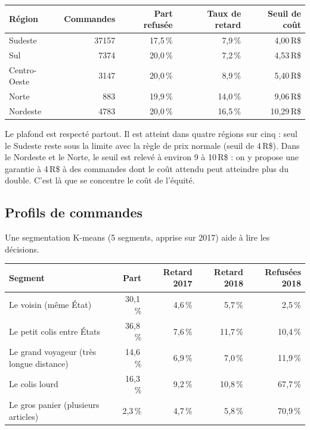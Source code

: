 \documentclass[11pt,a4paper]{article}
\newcommand{\RS}{\,R\$}
\begin{document}
\begin{center}
\begin{tabular}{@{}lrrrr@{}}
\toprule
Région & Commandes & Part refusée & Taux de retard & Seuil de coût \\
\midrule
Sudeste & \num{37157} & 17,5\,\% & 7,9\,\% & 4,00\RS{} \\
Sul & \num{7374} & 20,0\,\% & 7,2\,\% & 4,53\RS{} \\
Centro-Oeste & \num{3147} & 20,0\,\% & 8,9\,\% & 5,40\RS{} \\
Norte & 883 & 19,9\,\% & 14,0\,\% & 9,06\RS{} \\
Nordeste & \num{4783} & 20,0\,\% & 16,5\,\% & 10,29\RS{} \\
\bottomrule
\end{tabular}
\end{center}

Le plafond est respecté partout. Il est atteint dans quatre régions sur cinq : seul le Sudeste
reste sous la limite avec la règle de prix normale (seuil de 4\RS). Dans le Nordeste et le
Norte, le seuil est relevé à environ 9 à 10\RS{} : on y propose une garantie à 4\RS{} à des
commandes dont le coût attendu peut atteindre plus du double. C'est là que se concentre le
coût de l'équité.

\subsection{Profils de commandes}

Une segmentation K-means (5 segments, apprise sur 2017) aide à lire les décisions.

\begin{center}
\begin{tabular}{@{}lrrrr@{}}
\toprule
Segment & Part & Retard 2017 & Retard 2018 & Refusées 2018 \\
\midrule
Le voisin (même État) & 30,1\,\% & 4,6\,\% & 5,7\,\% & 2,5\,\% \\
Le petit colis entre États & 36,8\,\% & 7,6\,\% & 11,7\,\% & 10,4\,\% \\
Le grand voyageur (très longue distance) & 14,6\,\% & 6,9\,\% & 7,0\,\% & 11,9\,\% \\
Le colis lourd & 16,3\,\% & 9,2\,\% & 10,8\,\% & 67,7\,\% \\
Le gros panier (plusieurs articles) & 2,3\,\% & 4,7\,\% & 5,8\,\% & 70,9\,\% \\
\bottomrule
\end{tabular}
\end{center}
\end{document}
